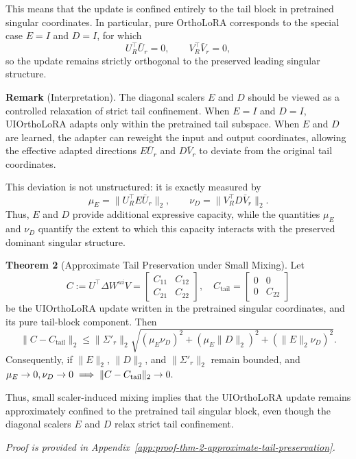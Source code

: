 \documentclass{article}
\begin{document}
This means that the update is confined entirely to the tail block in pretrained
singular coordinates. In particular, pure OrthoLoRA corresponds to the special
case $E=I$ and $D=I$, for which
\[
U_R^\top \bar{U}_r = 0,
\qquad
V_R^\top \bar{V}_r = 0,
\]
so the update remains strictly orthogonal to the preserved leading singular
structure.

\noindent \textbf{Remark} (Interpretation).
The diagonal scalers $E$ and $D$ should be viewed as a controlled relaxation of
strict tail confinement. When $E=I$ and $D=I$, UIOrthoLoRA adapts only within the pretrained tail subspace. When $E$ and $D$ are learned, the adapter can reweight
the input and output coordinates, allowing the effective adapted directions
$E\bar{U}_r$ and $D\bar{V}_r$ to deviate from the original tail coordinates.

This deviation is not unstructured: it is exactly measured by
\[
\mu_E = \|U_R^\top E\bar{U}_r\|_2,
\qquad
\nu_D = \|V_R^\top D\bar{V}_r\|_2.
\]
Thus, $E$ and $D$ provide additional expressive capacity, while the quantities
$\mu_E$ and $\nu_D$ quantify the extent to which this capacity interacts with
the preserved dominant singular structure.


\noindent \textbf{Theorem 2} (Approximate Tail Preservation under Small Mixing).
Let
\[
C := U^\top \Delta W^{ui} V
=
\begin{bmatrix}
C_{11} & C_{12} \\
C_{21} & C_{22}
\end{bmatrix},
\quad
C_{\mathrm{tail}}
=
\begin{bmatrix}
0 & 0 \\
0 & C_{22}
\end{bmatrix}
\]
be the UIOrthoLoRA update written in the pretrained singular coordinates, and its pure tail-block component. Then
\[
\|C-C_{\mathrm{tail}}\|_2
\leq
\|\Sigma'_r\|_2
\sqrt{
(\mu_E\nu_D)^2
+
(\mu_E\|D\|_2)^2
+
(\|E\|_2\nu_D)^2
}.
\]
Consequently, if $\|E\|_2$, $\|D\|_2$, and $\|\Sigma'_r\|_2$ remain bounded, and $\mu_E \to 0,
\nu_D \to 0 \\
\implies
\|C-C_{\mathrm{tail}}\|_2 \to 0.
$

Thus, small scaler-induced mixing implies that the UIOrthoLoRA update remains
approximately confined to the pretrained tail singular block, even though the
diagonal scalers $E$ and $D$ relax strict tail confinement.

\textit{Proof is provided in Appendix~\ref{app:proof-thm-2-approximate-tail-preservation}.}
\end{document}
